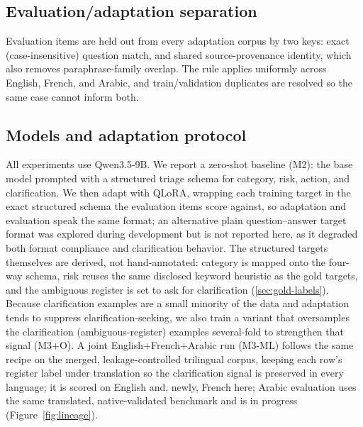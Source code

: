 \subsection{Evaluation/adaptation separation}

Evaluation items are held out from every adaptation corpus by two keys: exact (case-insensitive) question match, and shared source-provenance identity, which also removes paraphrase-family overlap. The rule applies uniformly across English, French, and Arabic, and train/validation duplicates are resolved so the same case cannot inform both.



\subsection{Models and adaptation protocol}

All experiments use Qwen3.5-9B. We report a zero-shot baseline (M2): the base model prompted with a structured triage schema for category, risk, action, and clarification. We then adapt with QLoRA, wrapping each training target in the exact structured schema the evaluation items score against, so adaptation and evaluation speak the same format; an alternative plain question--answer target format was explored during development but is not reported here, as it degraded both format compliance and clarification behavior. The structured targets themselves are derived, not hand-annotated: category is mapped onto the four-way schema, risk reuses the same disclosed keyword heuristic as the gold targets, and the ambiguous register is set to ask for clarification (\ref{sec:gold-labels}). Because clarification examples are a small minority of the data and adaptation tends to suppress clarification-seeking, we also train a variant that oversamples the clarification (ambiguous-register) examples several-fold to strengthen that signal (M3+O). A joint English+French+Arabic run (M3-ML) follows the same recipe on the merged, leakage-controlled trilingual corpus, keeping each row's register label under translation so the clarification signal is preserved in every language; it is scored on English and, newly, French here; Arabic evaluation uses the same translated, native-validated benchmark and is in progress (Figure~\ref{fig:lineage}).
